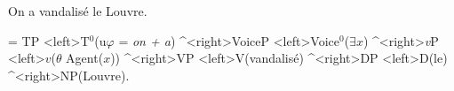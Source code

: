 \begin{exe}
	\ex On a vandalis\'{e} le Louvre.
	
	\jtree[scaleby=1.5, labelgap=0]
	\! = {TP}
	<left>{T$^{0}$}({u$\varphi$ = \textit{on + a}})             ^<right>{VoiceP}
	<left>{Voice$^{0}$}({$\exists x$})         ^<right>{\textit{v}P}
	<left>{$v$}({$\theta$ Agent($x$)})             ^<right>{VP}
	<left>{V}({vandalis\'{e}})                   ^<right>{DP}
	<left>{D}({le})                   ^<right>{NP}({Louvre}).
	\endjtree
\end{exe}
